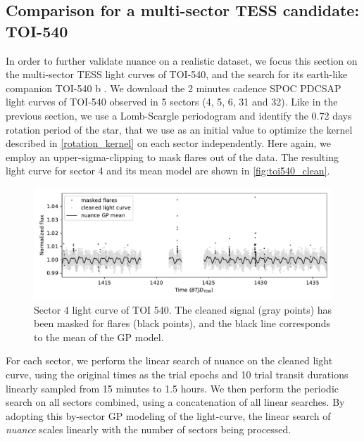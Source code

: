 \documentclass[modern]{aastex631}
\newcommand{\nuancemethod}{\textit{nuance}}
\newcommand{\nuance}{\nuancemethod{}}
\begin{document}
\subsection{Comparison for a multi-sector TESS candidate: TOI-540}\label{toi540}
In order to further validate nuance on a realistic dataset, we focus this section on the multi-sector TESS light curves of TOI-540, and the search for its earth-like companion TOI-540 b \citep{TOI540}. We download the 2 minutes cadence SPOC PDCSAP light curves of TOI-540 observed in 5 sectors (4, 5, 6, 31 and 32). Like in the previous section, we use a Lomb-Scargle periodogram and identify the 0.72 days rotation period of the star, that we use as an initial value to optimize the kernel described in \autoref{rotation_kernel} on each sector independently. Here again, we employ an upper-sigma-clipping to mask flares out of the data. The resulting light curve for sector 4 and its mean model are shown in \autoref{fig:toi540_clean}.
\begin{figure}[H]
    \begin{centering}
        \includegraphics[width=\linewidth]{../workflows/comparison_toi/figures/TOI 540/4.pdf}
        \caption{Sector 4 light curve of TOI 540. The cleaned signal (gray points) has been masked for flares (black points), and the black line corresponds to the mean of the GP model.}
        \label{fig:toi540_clean}
    \end{centering}
\end{figure}
For each sector, we perform the linear search of nuance on the cleaned light curve, using the original times as the trial epochs and 10 trial transit durations linearly sampled from 15 minutes to 1.5 hours. We then perform the periodic search on all sectors combined, using a concatenation of all linear searches. By adopting this by-sector GP modeling of the light-curve, the linear search of \nuance{} scales linearly with the number of sectors being processed.
\end{document}
